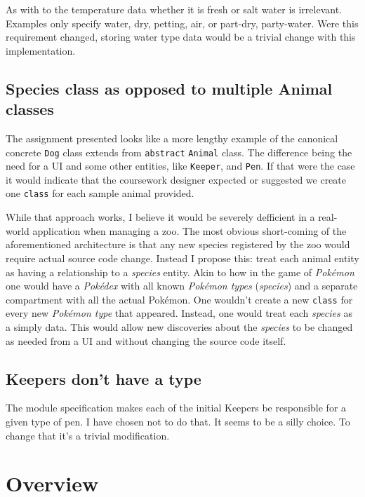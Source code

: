 \documentclass[english,a4paper,]{report}
\begin{document}
As with to the temperature data whether it is fresh or salt water is
irrelevant. Examples only specify water, dry, petting, air, or part-dry,
party-water. Were this requirement changed, storing water type data
would be a trivial change with this implementation.

\hypertarget{species-class-as-opposed-to-multiple-animal-classes}{%
\section{Species class as opposed to multiple Animal
classes}\label{species-class-as-opposed-to-multiple-animal-classes}}

The assignment presented looks like a more lengthy example of the
canonical concrete \texttt{Dog} class extends from \texttt{abstract}
\texttt{Animal} class. The difference being the need for a UI and some
other entities, like \texttt{Keeper}, and \texttt{Pen}. If that were the
case it would indicate that the coursework designer expected or
suggested we create one \texttt{class} for each sample animal provided.

While that approach works, I believe it would be severely defficient in
a real-world application when managing a zoo. The most obvious
short-coming of the aforementioned architecture is that any new species
registered by the zoo would require actual source code change. Instead I
propose this: treat each animal entity as having a relationship to a
\emph{species} entity. Akin to how in the game of \emph{Pokémon} one
would have a \emph{Pokédex} with all known \emph{Pokémon types}
(\emph{species}) and a separate compartment with all the actual Pokémon.
One wouldn't create a new \texttt{class} for every new \emph{Pokémon
type} that appeared. Instead, one would treat each \emph{species} as a
simply data. This would allow new discoveries about the \emph{species}
to be changed as needed from a UI and without changing the source code
itself.

\hypertarget{keepers-dont-have-a-type}{%
\section{Keepers don't have a type}\label{keepers-dont-have-a-type}}

The module specification makes each of the initial Keepers be
responsible for a given type of pen. I have chosen not to do that. It
seems to be a silly choice. To change that it's a trivial modification.

\hypertarget{overview}{%
\chapter{Overview}\label{overview}}
\end{document}
